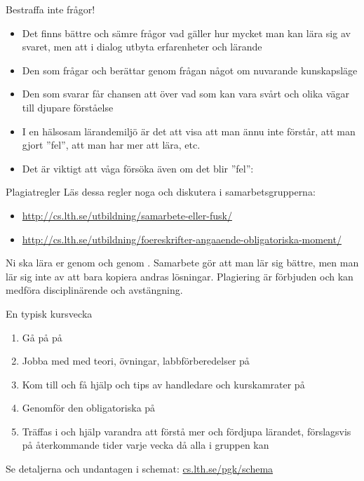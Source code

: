 \begin{Slide}{Bestraffa inte frågor!}
\begin{itemize}
\item Det finns bättre och sämre frågor vad gäller hur mycket man kan lära sig av svaret, men  att i dialog utbyta erfarenheter och lärande
\item Den som frågar  och berättar genom frågan något om nuvarande kunskapsläge
\item Den som svarar får chansen att  över vad som kan vara svårt och olika vägar till djupare förståelse
\item I en hälsosam lärandemiljö är det  att visa att man ännu inte förstår, att man gjort ''fel'', att man har mer att lära, etc. 
\item Det är viktigt att våga försöka även om det blir ''fel'':\\ 
\end{itemize}
\end{Slide}

\begin{Slide}{Plagiatregler}
Läs dessa regler noga och diskutera i samarbetsgrupperna:
\begin{itemize}
\footnotesize
\item \url{http://cs.lth.se/utbildning/samarbete-eller-fusk/}
\item \url{http://cs.lth.se/utbildning/foereskrifter-angaaende-obligatoriska-moment/}
\end{itemize}
Ni ska lära er genom  och genom  . Samarbete gör att man lär sig bättre, men man lär sig inte av att bara kopiera andras lösningar. Plagiering är förbjuden och kan medföra disciplinärende och avstängning.
\end{Slide}

\fi %

\begin{Slide}{En typisk kursvecka}
\begin{enumerate}
\item Gå på  på 
\item Jobba med  med teori, övningar, labbförberedelser på  
\item Kom till  och få hjälp och tips av handledare och kurskamrater på 
\item Genomför den obligatoriska  på 
\item Träffas i  och hjälp varandra att förstå mer och fördjupa lärandet, förslagsvis på återkommande tider varje vecka då alla i gruppen kan
\end{enumerate}
Se detaljerna och undantagen i schemat: \href{http://cs.lth.se/pgk/schema}{cs.lth.se/pgk/schema}
\end{Slide}

